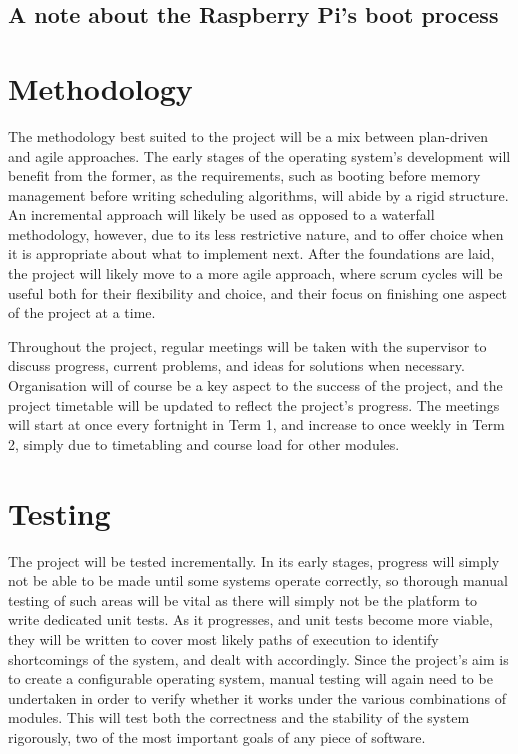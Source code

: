 \documentclass[10pt,a4paper]{article}
\begin{document}
\subsection*{A note about the Raspberry Pi's boot process}

\section*{Methodology}
The methodology best suited to the project will be a mix between plan-driven and
agile approaches. The early stages of the operating system's development will
benefit from the former, as the requirements, such as booting before memory
management before writing scheduling algorithms, will abide by a rigid
structure. An incremental approach will likely be used as opposed to a waterfall
methodology, however, due to its less restrictive nature, and to offer choice
when it is appropriate about what to implement next. After the foundations are
laid, the project will likely move to a more agile approach, where scrum cycles
will be useful both for their flexibility and choice, and their focus on
finishing one aspect of the project at a time.

Throughout the project, regular meetings will be taken with the supervisor to
discuss progress, current problems, and ideas for solutions when necessary.
Organisation will of course be a key aspect to the success of the project, and
the project timetable will be updated to reflect the project's progress. The
meetings will start at once every fortnight in Term 1, and increase to once
weekly in Term 2, simply due to timetabling and course load for other modules.

\section*{Testing}
The project will be tested incrementally. In its early stages, progress will
simply not be able to be made until some systems operate correctly, so thorough
manual testing of such areas will be vital as there will simply not be the
platform to write dedicated unit tests. As it progresses, and unit tests become
more viable, they will be written to cover most likely paths of execution to
identify shortcomings of the system, and dealt with accordingly. Since the
project's aim is to create a configurable operating system, manual testing will
again need to be undertaken in order to verify whether it works under the
various combinations of modules. This will test both the correctness and the
stability of the system rigorously, two of the most important goals of any piece
of software.
\end{document}
